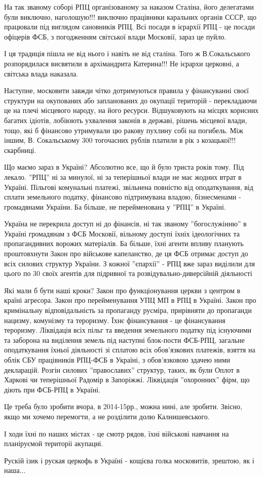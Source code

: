 На так званому соборі РПЦ організованому за наказом Сталіна, його делегатами
були виключно, наголошую!!! виключно працівники каральних органів СССР, що
працювали під виглядом сановників РПЦ. Всі посади в ієрархії  РПЦ - це посади
офіцерів ФСБ, з погодженням світської влади Московії, зараз це пуйло. 

І ця традиція пішла не від нього і навіть не від сталіна. Того ж В.Сокальського
розпорядилася висвятили в архімандрита Катерина!!! Не ієрархи церковні, а
світська влада наказала.

Наступне, московити завжди чітко дотримуються правила у фінансуванні своєї
структури на окупованих або запланованих до окупації територій - перекладаючи
це на плечі місцевого народу, на його ресурси. Відшуковують на місцях
корисних багатих ідіотів, лобіюють ухвалення законів в державі, рішень
місцевої влади, тощо, які б фінансово утримували цю ракову пухлину собі на
погибель. Між іншим, В. Сокальському 300 тогочасних рублів платили в рік з
козацької!!! скарбниці. 

Що маємо зараз в Україні? Абсолютно все, що й було триста років тому. Під
лекало. ''РПЦ'' ні за минулої, ні за теперішньої влади не має жодних втрат в
Україні. Пільгові комунальні платежі, звільнена повністю від оподаткування,
від сплати земельного податку, фінансово підтримувана владою, бізнесменами -
громадянами України. Ба більше, не перейменована у ''РПЦ'' в Україні. 

Україна не перекрила доступ ні до фінансів, ні так званому ''богослужінню'' в
Україні громадянам з ФСБ Московії, вільному доступі їхніх ідеологічних та
пропагандивних ворожих матеріалів. Ба більше, їхні агенти впливу планують
проштовхнути Закон про військове капеланство, де ця ФСБ отримає доступ до всіх
силових структур України. З кожної ''єпархії'' - РПЦ вже зараз виділили для
цього по 30 своїх агентів для підривної та розвідувально-диверсійній діяльності

Які мали б бути наші кроки? Закон про функціонування церкви з центром в
країні агресора. Закон про перейменування УПЦ МП в РПЦ в Україні. Закон про
кримінальну відповідальність за пропаганду русміра,  прирівняти до пропаганди
нацизму, комунізму та тероризму. Їхнє фінансування - це фінансування
тероризму. Ліквідація всіх пільг та введення земельного податку під існуючими
та заборона на виділення земель під наступні блок-пости ФСБ-РПЦ, загальне
оподаткування їхньої діяльності зі сплатою всіх обов'язкових платежів, взяття
на облік СБУ працівників РПЦ-ФСБ в Україні, з обов'язковою здачею ними
декларацій. Розгін силових ''православих'' структур, таких, як були Оплот в
Харкові чи теперішньої Радомір в Запоріжжі. Ліквідація ''охоронних'' фірм, що
діють при ФСБ-РПЦ в Україні. 

Це треба було зробити вчора, в 2014-15рр., можна нині, але зробити. Звісно,
якщо ми хочемо перемогти, а не розділити долю Калнишевського. 

І ходи їхні по наших містах - це смотр рядов, їхні військові навчання на
планіруємой територіі акупациі. 

Рускій ізик і руская церкофь в Україні - кощієва голка московитів, зрештою, як
і наша...

